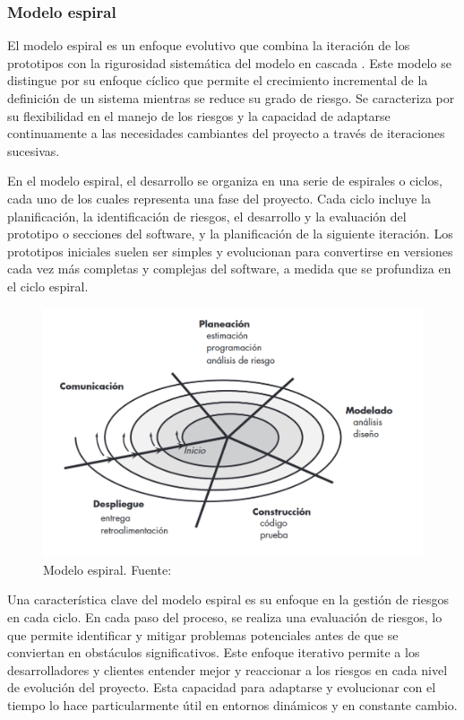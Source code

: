 \documentclass[main.tex]{subfiles}
\begin{document}
\subsubsection{Modelo espiral}

El modelo espiral es un enfoque evolutivo que combina la iteración de los prototipos con la rigurosidad sistemática del modelo en cascada \cite{pressman2010ingeneria}. Este modelo se distingue por su enfoque cíclico que permite el crecimiento incremental de la definición de un sistema mientras se reduce su grado de riesgo. Se caracteriza por su flexibilidad en el manejo de los riesgos y la capacidad de adaptarse continuamente a las necesidades cambiantes del proyecto a través de iteraciones sucesivas.

En el modelo espiral, el desarrollo se organiza en una serie de espirales o ciclos, cada uno de los cuales representa una fase del proyecto. Cada ciclo incluye la planificación, la identificación de riesgos, el desarrollo y la evaluación del prototipo o secciones del software, y la planificación de la siguiente iteración. Los prototipos iniciales suelen ser simples y evolucionan para convertirse en versiones cada vez más completas y complejas del software, a medida que se profundiza en el ciclo espiral.

\begin{figure}[h]
	\centering
	\includegraphics[width=\linewidth]{./assets/model-spiral.png}
	\caption{Modelo espiral. Fuente: \cite{pressman2010ingeneria}}
\end{figure}

Una característica clave del modelo espiral es su enfoque en la gestión de riesgos en cada ciclo. En cada paso del proceso, se realiza una evaluación de riesgos, lo que permite identificar y mitigar problemas potenciales antes de que se conviertan en obstáculos significativos. Este enfoque iterativo permite a los desarrolladores y clientes entender mejor y reaccionar a los riesgos en cada nivel de evolución del proyecto. Esta capacidad para adaptarse y evolucionar con el tiempo lo hace particularmente útil en entornos dinámicos y en constante cambio.
\end{document}
